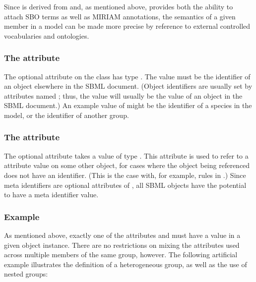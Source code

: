 Since \Member is derived from \SBase and, as mentioned above, \SBase provides both the ability to attach SBO terms as well as MIRIAM annotations, the semantics of a given member in a model can be made more precise by reference to external controlled vocabularies and ontologies.


\subsubsection{The \fixttspace{} attribute}
\label{member-idref-attribute}

The optional attribute  on the \Member class has type .  The value must be the identifier of an object elsewhere in the SBML document.  (Object identifiers are usually set by attributes named ; thus, the  value will usually be the  value of an object in the SBML document.)  An example value of  might be the identifier of a species in the model, or the identifier of another group.


\subsubsection{The \fixttspace{} attribute}
\label{member-metaidref-attribute}

The optional \Member attribute  takes a value of type .  This attribute is used to refer to a  attribute value on some other object, for cases where the object being referenced does not have an identifier.  (This is the case with, for example, rules in \sbmlthreecore.)  Since meta identifiers are optional attributes of \SBase, all SBML objects have the potential to have a meta identifier value.


\subsubsection{Example}

As mentioned above, exactly one of the attributes  and  must have a value in a given \Member object instance.  There are no restrictions on mixing the attributes used across multiple members of the same group, however.  The following artificial example illustrates the definition of a heterogeneous group, as well as the use of nested groups:

